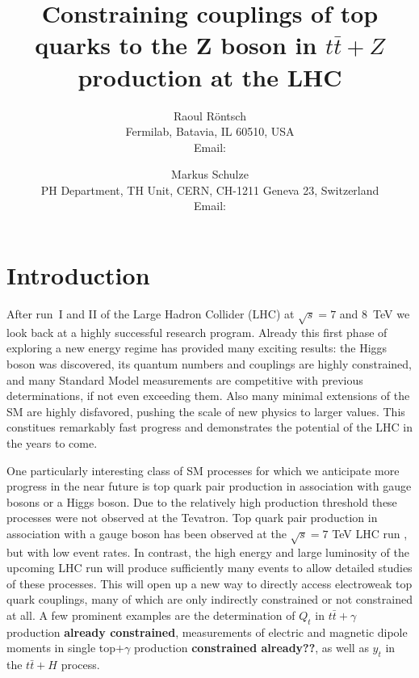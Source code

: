 \documentclass[preprint]{JHEP3} %
\title{Constraining couplings of top quarks to the Z boson in $t\bar{t}+Z$ production at the LHC}
\author{Raoul R\"ontsch \\ Fermilab, Batavia, IL 60510, USA \\
  Email: \email{rontsch@fnal.gov} }
\author{Markus Schulze \\ PH Department, TH Unit, CERN, CH-1211 Geneva 23, Switzerland \\
  Email: \email{markus.schulze@cern.ch} }
\def\ttb{t\bar{t}}
\begin{document}
\section{Introduction}
After run~I and II of the Large Hadron Collider (LHC) at $\sqrt{s}=7$ and 8~TeV we look back at a highly successful research program.
Already this first phase of exploring a new energy regime has provided many exciting results: 
the Higgs boson was discovered, its quantum numbers and couplings are highly constrained,
and many Standard Model measurements are competitive with previous determinations, if not even exceeding them.
Also many minimal extensions of the SM are highly disfavored, pushing the scale of new physics to larger values.
This constitues remarkably fast progress and demonstrates the potential of the LHC in the years to come.

One particularly interesting class of SM processes for which we anticipate more progress in the near future is top quark pair production in association with gauge bosons or a Higgs boson.
Due to the relatively high production threshold these processes were not observed at the Tevatron. Top quark pair production in association with a gauge boson has been observed at the $\sqrt{s}=7$ TeV LHC run \cite{ATLAS-CONF-2012-126,Chatrchyan:2013qca}, but with low event rates.
In contrast, the high energy and large luminosity of the upcoming LHC run will produce sufficiently many events to allow detailed studies of these processes.
This will open up a new way to directly access electroweak top quark couplings, many of which are only indirectly constrained or not constrained at all.
A few prominent examples are the determination of $Q_t$ in $\ttb+\gamma$ production {\bf already constrained}, measurements of electric and magnetic dipole moments in single top$+\gamma$ production {\bf constrained already??}, 
as well as $y_t$ in the $\ttb+H$ process.

\end{document}
